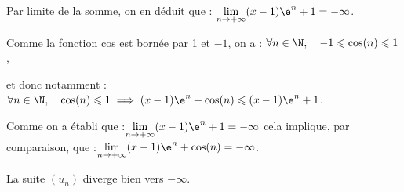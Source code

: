 \begin{enumerate}
Par limite de la somme, on en déduit que : \quad $\lim\limits_{n \to +\infty} (x-1) \e^{n} + 1 = -\infty$.

Comme la fonction cos est bornée par 1 et $-1$, on a : \quad $\forall n \in \N,\quad -1 \leqslant \cos(n) \leqslant 1$,

et donc notamment :\quad $\forall n \in \N,\quad \cos(n) \leqslant 1 \implies (x-1) \e^{n} + \cos(n) \leqslant (x-1) \e^{n} + 1$.

Comme on a établi que :\quad $\lim\limits_{n \to +\infty} (x-1) \e^{n} + 1 = -\infty$ \quad cela implique, par comparaison, que :\quad $\lim\limits_{n \to +\infty} (x-1) \e^{n} + \cos(n) = -\infty$.

La suite $(u_n)$ diverge bien vers $-\infty$.
\end{enumerate}
